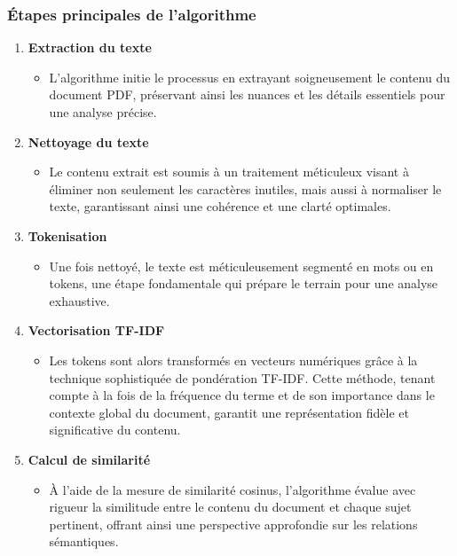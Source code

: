 \subsubsection{Étapes principales de l'algorithme }
\vspace{5mm}
\begin{enumerate}

\item \textbf{ Extraction du texte }
\begin{itemize}[label=$\bullet$]
\item L'algorithme initie le processus en extrayant soigneusement le contenu du document PDF, préservant ainsi les nuances et les détails essentiels pour une analyse précise.
\end{itemize}
\vspace{3mm}
\item  \textbf{Nettoyage du texte }
\begin{itemize}[label=$\bullet$]
\item Le contenu extrait est soumis à un traitement méticuleux visant à éliminer non seulement les caractères inutiles, mais aussi à normaliser le texte, garantissant ainsi une cohérence et une clarté optimales.
\end{itemize}
\vspace{3mm}

\item  \textbf{Tokenisation }
\begin{itemize}[label=$\bullet$]
\item Une fois nettoyé, le texte est méticuleusement segmenté en mots ou en tokens, une étape fondamentale qui prépare le terrain pour une analyse exhaustive.
\end{itemize}
\vspace{3mm}

\item  \textbf{Vectorisation TF-IDF }
\begin{itemize}[label=$\bullet$]
\item Les tokens sont alors transformés en vecteurs numériques grâce à la technique sophistiquée de pondération TF-IDF. Cette méthode, tenant compte à la fois de la fréquence du terme et de son importance dans le contexte global du document, garantit une représentation fidèle et significative du contenu.
\end{itemize}
\vspace{3mm}

\item  \textbf{Calcul de similarité }
\begin{itemize}[label=$\bullet$]
\item À l'aide de la mesure de similarité cosinus, l'algorithme évalue avec rigueur la similitude entre le contenu du document et chaque sujet pertinent, offrant ainsi une perspective approfondie sur les relations sémantiques.


\end{itemize}
\end{enumerate}
